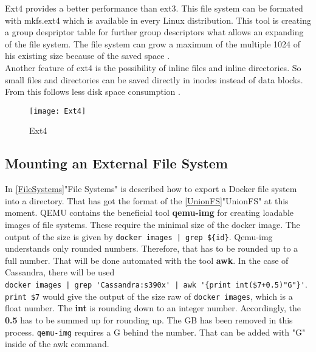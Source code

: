 Ext4 provides a better performance than ext3. 
This file system can be formated with mkfs.ext4 which is available in every Linux distribution.
This tool is creating a group despriptor table for further group descriptors what allows an expanding of the file system. The file system can grow a maximum of the multiple 1024 of his existing size because of the saved space \cite[~p.21]{Seufert2015}. \\

Another feature of ext4 is the possibility of inline files and inline directories. So small files and directories can be saved directly in inodes instead of data blocks. From this follows less disk space consumption \cite[p.24]{Seufert2015}.

\begin{figure}[H]
\centering
\texttt{[image: Ext4]}
 \caption{Ext4}
    \label{Ext4}
\end{figure}

\subsection{Mounting an External File System}

In \ref{FileSystems}"File Systems" is described how to export a Docker file system into a directory. That has got the format of the \ref{UnionFS}"UnionFS" at this moment. QEMU contains the beneficial tool \textbf{qemu-img} for creating loadable images of file systems. These require the minimal size of the docker image. The output of the size is given by \lstinline!docker images | grep ${id}!. Qemu-img understands only rounded numbers. Therefore, that has to be rounded up to a full number. That will be done automated with the tool \textbf{awk}. 
In the case of Cassandra, there will be used \\
\lstinline!docker images | grep 'Cassandra:s390x' | awk '{print int($7+0.5)"G"}'!. \\
\lstinline!print $7! would give the output of the size raw of \lstinline!docker images!, which is a float number. The \textbf{int} is rounding down to an integer number. Accordingly, the \textbf{0.5} has to be summed up for rounding up. The GB has been removed in this process. \lstinline!qemu-img! requires a G behind the number. That can be added with "G" inside of the awk command. \\


